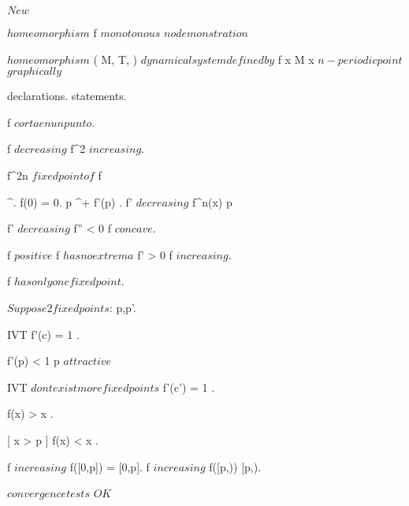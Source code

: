 \documentclass[../Main/main]{subfiles}
\begin{document}
\unit{ $ New $ }
{
	
	{
		{
			 $ homeomorphism $
		}
		\holds
		{
			f $ monotonous $
		}
		\demonstration
		{
			$ no demonstration $
		}
	}
	
	
	{
		{
			 $ homeomorphism $
			( M, T, \phi ) $ dynamical system defined by $ f
		}
		\holds
		{
			{
				\nexists \; x \in M \suchthat x $ n-periodic point $
			}
		}
		\demonstration
		{
			$graphically $
		}
	}
	
	
	{
		{
			declarations.
		}
		\showthat
		{
			statements.
		}
		\demonstration
		{
			f $ corta en un punto $.

			f $ decreasing $ \imp f^2 $ increasing $.

			f^{2n} \convergesto $ fixed point of $ f
		}
	}
	
	
	{
		{
			 \in \C^{\infty}.
			f(0) = 0.
			p \in \R^+ \nonzero \suchthat f'(p) \geq 0.
			f' $ decreasing $
		}
		\showthat
		{
			\all{ p \in \R^+ \nonzero }
			{
				f^n(x) \convergesto p
			}
		}
		\demonstration
		{
			f' $ decreasing $ \imp f'' < 0 \imp f $ concave $.

			f $ positive $ \imp f $ has no extrema $ \imp f' > 0 \imp f $ increasing $.


			f $ has only one fixed point $.

			$Suppose 2 fixed points $: p,p'.

			IVT \imp \ex{ c \in (0,p') }
			{
				f'(c) = 1
			}.

			f'(p) < 1 \imp p $ attractive $

			IVT \imp $ dont exist more fixed points $ \imp f'(c') = 1 \nleq 1.

			\all{ x \in (0,p) }
			{
				f(x) > x
			}.

			{
				f(x) < x
			}.

			f $ increasing $ \imp f([0,p]) = [0,p].
			f $ increasing $ \imp f([p,\infty)) \subset [p,\infty).

			$ convergence tests $ \imp $OK$
		}
	}
	
	
		

}
\end{document}
